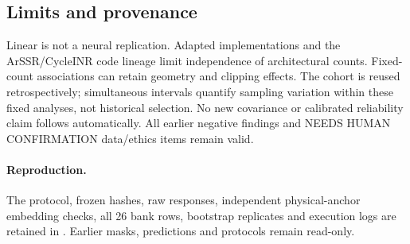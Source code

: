 \subsection{Limits and provenance}

Linear is not a neural replication. Adapted implementations and the ArSSR/CycleINR code lineage limit independence of architectural counts. Fixed-count associations can retain geometry and clipping effects. The cohort is reused retrospectively; simultaneous intervals quantify sampling variation within these fixed analyses, not historical selection. No new covariance or calibrated reliability claim follows automatically. All earlier negative findings and NEEDS HUMAN CONFIRMATION data/ethics items remain valid.

\paragraph{Reproduction.} The protocol, frozen hashes, raw responses, independent physical-anchor embedding checks, all 26 bank rows, bootstrap replicates and execution logs are retained in . Earlier masks, predictions and protocols remain read-only.